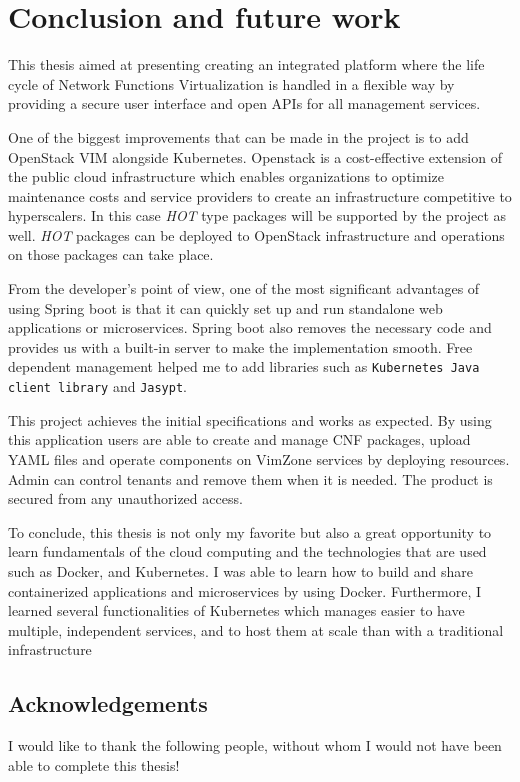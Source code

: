 \chapter*{Conclusion and future work} %
\label{ch:sum}

This thesis aimed at presenting creating an integrated platform where the life cycle of Network Functions Virtualization is handled in a flexible way by providing a secure user interface and open APIs for all management services.

One of the biggest improvements that can be made in the project is to add OpenStack VIM alongside Kubernetes. Openstack is a cost-effective extension of the public cloud infrastructure which enables organizations to optimize maintenance costs and service providers to create an infrastructure competitive to hyperscalers. In this case \emph{HOT} type packages will be supported by the project as well. \emph{HOT} packages can be deployed to OpenStack infrastructure and operations on those packages can take place.

From the developer’s point of view, one of the most significant advantages of using Spring boot is that it can quickly set up and run standalone web applications or microservices. Spring boot also removes the necessary code and provides us with a built-in server to make the implementation smooth. Free dependent management helped me to add libraries such as \texttt{Kubernetes Java client library} and \texttt{Jasypt}. 

This project achieves the initial specifications and works as expected. By using this application users are able to create and manage CNF packages, upload YAML files and operate components on VimZone services by deploying resources. Admin can control tenants and remove them when it is needed. The product is secured from any unauthorized access.

To conclude, this thesis is not only my favorite but also a great opportunity to learn fundamentals of the cloud computing and the technologies that are used such as Docker, and Kubernetes. I was able to learn how to build and share containerized applications and microservices by using Docker. Furthermore, I learned several functionalities of Kubernetes which manages easier to have multiple, independent services, and to host them at scale than with a traditional infrastructure

\section*{Acknowledgements}
I would like to thank the following people, without whom I would not have been able to complete this thesis!


